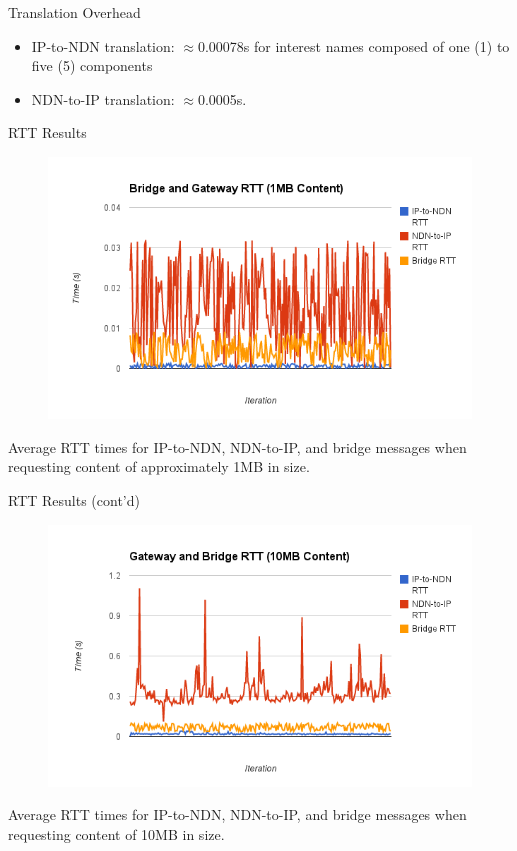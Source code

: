\documentclass[handout]{beamer}
\begin{document}
\begin{frame}{Translation Overhead}
	\begin{itemize}
		\item IP-to-NDN translation: $\approx$0.00078s for interest names composed of one (1) to five (5) components
		\item NDN-to-IP translation: $\approx$0.0005s.
	\end{itemize}
\end{frame}

\begin{frame}{RTT Results}
	\begin{figure}
	\begin{center}
	\includegraphics[scale=0.4]{./img/small.png}
	\label{fig:perf1}
	\end{center}
	\end{figure}
	Average RTT times for IP-to-NDN, NDN-to-IP, and bridge messages when requesting content of approximately 1MB in size.
\end{frame}

\begin{frame}{RTT Results (cont'd)}
	\begin{figure}
	\begin{center}
	\includegraphics[scale=0.4]{./img/large.png}
	\label{fig:perf2}
	\end{center}
	\end{figure}
	Average RTT times for IP-to-NDN, NDN-to-IP, and bridge messages when requesting content of 10MB in size.
\end{frame}
\end{document}
